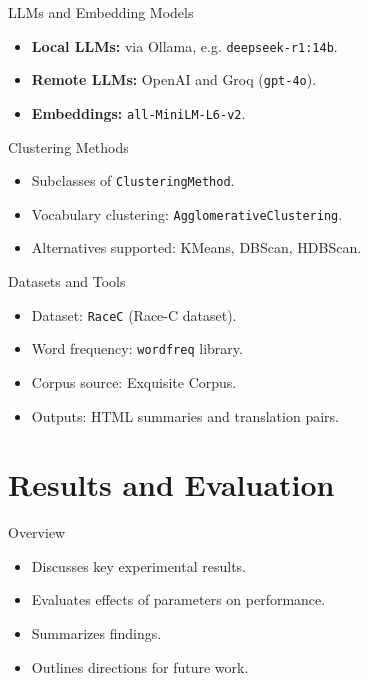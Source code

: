 \documentclass{beamer}
\begin{document}
\begin{frame}{LLMs and Embedding Models}
	\begin{itemize}
		\item \textbf{Local LLMs:} via Ollama, e.g. \texttt{deepseek-r1:14b}.
		\item \textbf{Remote LLMs:} OpenAI and Groq (\texttt{gpt-4o}).
		\item \textbf{Embeddings:} \texttt{all-MiniLM-L6-v2}.
	\end{itemize}
\end{frame}

\begin{frame}{Clustering Methods}
	\begin{itemize}
		\item Subclasses of \texttt{ClusteringMethod}.
		\item Vocabulary clustering: \texttt{AgglomerativeClustering}.
		\item Alternatives supported: KMeans, DBScan, HDBScan.
	\end{itemize}
\end{frame}

\begin{frame}{Datasets and Tools}
	\begin{itemize}
		\item Dataset: \texttt{RaceC} (Race-C dataset).
		\item Word frequency: \texttt{wordfreq} library.
		\item Corpus source: Exquisite Corpus.
		\item Outputs: HTML summaries and translation pairs.
	\end{itemize}
\end{frame}

\section{Results and Evaluation}

\begin{frame}{Overview}
	\begin{itemize}
		\item Discusses key experimental results.
		\item Evaluates effects of parameters on performance.
		\item Summarizes findings.
		\item Outlines directions for future work.
	\end{itemize}
\end{frame}
\end{document}
